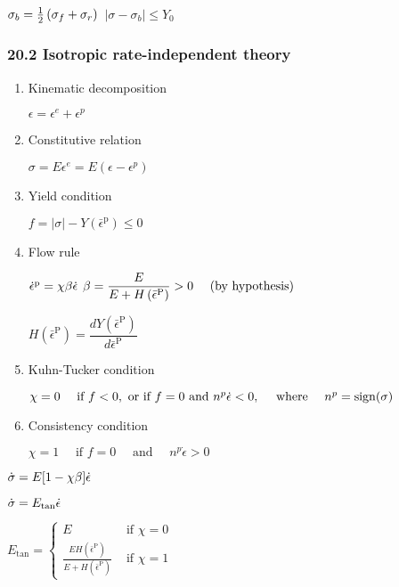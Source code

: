 \(\sigma_{b}=\frac{1}{2}\left(\sigma_{f}+\sigma_{r}\right)\\\)
\(\left|\sigma-\sigma_{b}\right| \leq Y_{0}\)

\hypertarget{isotropic-rate-independent-theory}{%
\subsubsection{20.2 Isotropic rate-independent
theory}\label{isotropic-rate-independent-theory}}

\begin{enumerate}
\def\labelenumi{\arabic{enumi}.}
\item
  Kinematic decomposition

  \(\epsilon=\epsilon^{e}+\epsilon^{p}\)
\item
  Constitutive relation

  \(\sigma=E \epsilon^{e}=E\left(\epsilon-\epsilon^{p}\right)\)
\item
  Yield condition

  \(f=|\sigma|-Y\left(\bar{\epsilon}^{\mathrm{p}}\right) \leq 0\)
\item
  Flow rule

  \(\dot{\epsilon}^{\mathrm{p}}=\chi \beta \dot{\epsilon}\\\)
  \(\beta=\dfrac{E}{E+H\left(\bar{\epsilon}^{\mathrm{P}}\right)}>0 \quad \text { (by hypothesis) }\\\)

  \(H\left(\bar{\epsilon}^{\mathrm{P}}\right)=\dfrac{d Y\left(\bar{\epsilon}^{\mathrm{P}}\right)}{d \bar{\epsilon}^{\mathrm{P}}}\)
\item
  Kuhn-Tucker condition

  \(\chi=0 \quad {\text { if } f<0, \text { or if } f=0 \text { and } n^{p} \dot{\epsilon}<0, \quad \text { where } \quad n^{p}=\operatorname{sign}(\sigma)}\\\)
\item
  Consistency condition

  \(\chi=1 \quad {\text { if } f=0 \quad \text { and } \quad n^{p} \dot{\epsilon}>0}\)
\end{enumerate}

\(\dot{\sigma}=E[1-\chi \beta] \dot{\epsilon} \\\)

\(\dot{\sigma}=E_{\mathrm{tan}} \dot{\epsilon} \\\)

\({E_{\mathrm{tan}}=\left\{\begin{array}{ll}{E} & {\text { if } \chi=0} \\ {\frac{E H\left(\bar{\epsilon}^{\mathrm{P}}\right)}{E+H\left(\bar{\epsilon}^{\mathrm{P}}\right)}} & {\text { if } \chi=1}\end{array}\right.}\)

